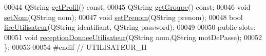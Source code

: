 \begin{DoxyCode}
00044     QString \hyperlink{class_utilisateur_a8d838ae68c0be760d6fb4a27d8d7ba08}{getProfil}() \textcolor{keyword}{const};
00045     QString \hyperlink{class_utilisateur_a9922d48c4d295c9357ad8102399322ec}{getGroupe}() \textcolor{keyword}{const};
00046     \textcolor{keywordtype}{void} \hyperlink{class_utilisateur_aec15176f18c3ae77a04214dd35e917db}{setNom}(QString nom);
00047     \textcolor{keywordtype}{void} \hyperlink{class_utilisateur_a41e12e2817f4b6ad1fe5ef0f3417caf3}{setPrenom}(QString prenom);
00048     \textcolor{keywordtype}{bool} \hyperlink{class_utilisateur_a5911f84daf6d47d7f50e6d16022b292e}{lireUtilisateur}(QString identifiant, QString password);
00049 
00050 \textcolor{keyword}{public} slots:
00051     \textcolor{keywordtype}{void} \hyperlink{class_utilisateur_a81311d8a9f62ffdfb8ee65d37461ea17}{receptionDonneeUtilisateur}(QString nom,QString motDePasse);
00052 \};
00053 
00054 \textcolor{preprocessor}{#endif // UTILISATEUR\_H}
\end{DoxyCode}
